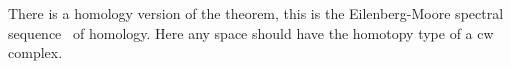 \documentclass{scrartcl}
\theoremstyle{plain}
\theoremstyle{definition}
\begin{document}



There is a homology version of the theorem, this is the Eilenberg-Moore spectral sequence~\cite{eilenberg1966homology} of homology. Here any space should have the homotopy type of a cw complex.
\end{document}
